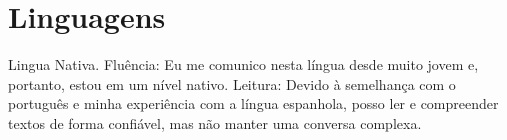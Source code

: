 \section{Linguagens}
{Lingua Nativa.}
{Fluência: Eu me comunico nesta língua desde muito jovem e, portanto, estou em um nível nativo.}
{Leitura: Devido à semelhança com o português e minha experiência com a língua espanhola, posso ler e compreender textos de forma confiável, mas não manter uma conversa complexa.}
